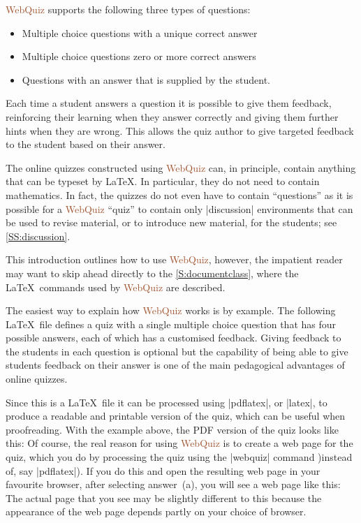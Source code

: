 \documentclass[svgnames]{article}
\newcommand\WebQuiz{\textcolor{Sienna}{WebQuiz}\xspace}
\begin{document}
      \WebQuiz supports the following three types of questions:
      \begin{itemize}
        \item Multiple choice questions with a unique correct answer
        \item Multiple choice questions zero or more correct answers
        \item Questions with an answer that is supplied by the student.
      \end{itemize}
      Each time a student answers a question it is possible to give them
      feedback, reinforcing their learning when they answer correctly and
      giving them further hints when they are wrong. This allows the
      quiz author to give targeted feedback to the student based on their
      answer.

      The online quizzes constructed using \WebQuiz can, in principle,
      contain anything that can be typeset by \LaTeX. In particular, they
      do not need to contain mathematics. In fact, the quizzes do not even
      have to contain ``questions'' as it is possible for a \WebQuiz
      ``quiz'' to contain only \LatexCode|discussion| environments that can
      be used to revise material, or to introduce new material, for the
      students; see \autoref{SS:discussion}.

      This introduction outlines how to use \WebQuiz, however, the
      impatient reader may want to skip ahead directly to the
      \autoref{S:documentclass}, where the \LaTeX\ commands used by
      \WebQuiz are described.

      The easiest way to explain how \WebQuiz works is by example. The
      following \LaTeX\ file defines a quiz with a single multiple choice
      question that has four possible answers, each of which has a
      customised feedback. Giving feedback to the students in each
      question is optional but the capability of being able to give
      students feedback on their answer is one of the main pedagogical
      advantages of online quizzes.


      Since this is a \LaTeX\ file it can be processed using
      \BashCode|pdflatex|, or \BashCode|latex|, to produce a readable and
      printable version of the quiz, which can be useful when
      proofreading. With the example above, the PDF version of the quiz looks
      like this:
      Of course, the real reason for using \WebQuiz is to create a
      web page for the quiz, which you do by processing the quiz using
      the \BashCode|webquiz| command )instead of, say
      \BashCode|pdflatex|). If you do this and open the resulting
      web page in your favourite browser, after selecting answer~(a), you
      will see a web page like this:
      The actual page that you see may be slightly different to
      this because the appearance of the web page depends partly on your
      choice of browser.
\end{document}
